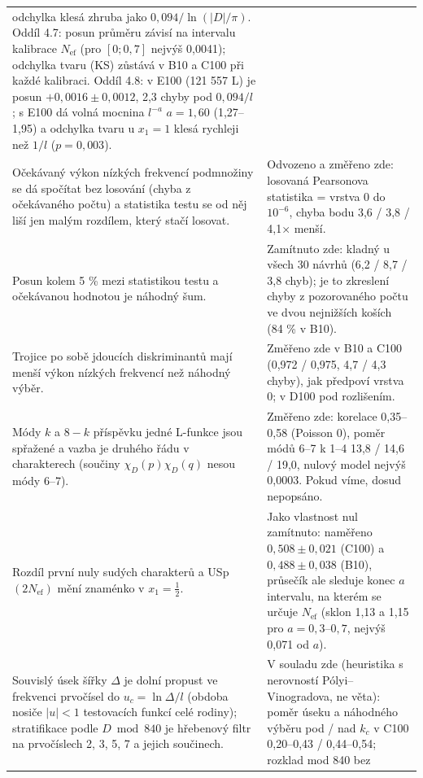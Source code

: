 \documentclass[
  10pt,
]{article}
\begin{document}
{\begin{longtable}[]{@{}
  >{\raggedright\arraybackslash}p{}
  >{\raggedright\arraybackslash}p{}@{}}
odchylka klesá zhruba jako \(0{,}094/\ln(|D|/\pi)\). Oddíl 4.7: posun
průměru závisí na intervalu kalibrace \(N_{\mathrm{ef}}\) (pro
\([0; 0{,}7]\) nejvýš 0,0041); odchylka tvaru (KS) zůstává v B10 a C100
při každé kalibraci. Oddíl 4.8: v E100 (121 557 L) je posun
\(+0{,}0016 \pm 0{,}0012\), 2,3 chyby pod \(0{,}094/l\); s E100 dá volná
mocnina \(l^{-a}\) \(a = 1{,}60\) (1,27--1,95) a odchylka tvaru u
\(x_1 = 1\) klesá rychleji než \(1/l\) (\(p = 0{,}003\)). \\ \addlinespace[2pt]
Očekávaný výkon nízkých frekvencí podmnožiny se dá spočítat bez losování
(chyba z očekávaného počtu) a statistika testu se od něj liší jen malým
rozdílem, který stačí losovat. & Odvozeno a změřeno zde: losovaná
Pearsonova statistika = vrstva 0 do \(10^{-6}\), chyba bodu 3,6 / 3,8 /
4,1× menší. \\ \addlinespace[2pt]
Posun kolem 5 \% mezi statistikou testu a očekávanou hodnotou je náhodný
šum. & Zamítnuto zde: kladný u všech 30 návrhů (6,2 / 8,7 / 3,8 chyb);
je to zkreslení chyby z pozorovaného počtu ve dvou nejnižších koších (84
\% v B10). \\ \addlinespace[2pt]
Trojice po sobě jdoucích diskriminantů mají menší výkon nízkých
frekvencí než náhodný výběr. & Změřeno zde v B10 a C100 (0,972 / 0,975,
4,7 / 4,3 chyby), jak předpoví vrstva 0; v D100 pod rozlišením. \\ \addlinespace[2pt]
Módy \(k\) a \(8 - k\) příspěvku jedné L-funkce jsou spřažené a vazba je
druhého řádu v charakterech (součiny \(\chi_D(p)\chi_D(q)\) nesou módy
6--7). & Změřeno zde: korelace 0,35--0,58 (Poisson 0), poměr módů 6--7 k
1--4 13,8 / 14,6 / 19,0, nulový model nejvýš 0,0003. Pokud víme, dosud
nepopsáno. \\ \addlinespace[2pt]
Rozdíl první nuly sudých charakterů a USp\((2N_{\mathrm{ef}})\) mění
znaménko v \(x_1 = \frac12\). & Jako vlastnost nul zamítnuto: naměřeno
\(0{,}508 \pm 0{,}021\) (C100) a \(0{,}488 \pm 0{,}038\) (B10), průsečík
ale sleduje konec \(a\) intervalu, na kterém se určuje
\(N_{\mathrm{ef}}\) (sklon 1,13 a 1,15 pro \(a = 0{,}3\)--\(0{,}7\),
nejvýš 0,071 od \(a\)). \\ \addlinespace[2pt]
Souvislý úsek šířky \(\Delta\) je dolní propust ve frekvenci prvočísel
do \(u_c = \ln\Delta/l\) (obdoba nosiče \(|u| < 1\) testovacích funkcí
celé rodiny); stratifikace podle \(D \bmod 840\) je hřebenový filtr na
prvočíslech 2, 3, 5, 7 a jejich součinech. & V souladu zde (heuristika s
nerovností Pólyi--Vinogradova, ne věta): poměr úseku a náhodného výběru
pod / nad \(k_c\) v C100 0,20--0,43 / 0,44--0,54; rozklad mod 840 bez

\end{longtable}}
\end{document}
